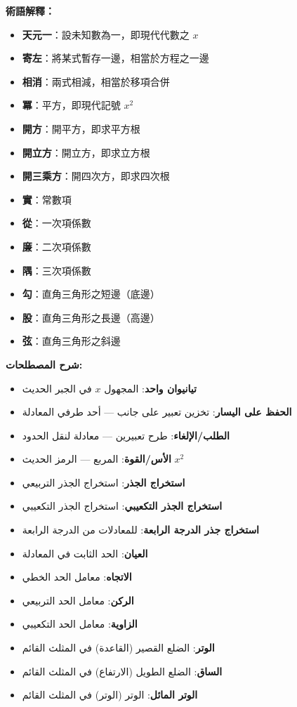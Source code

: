 \documentclass[11pt,a4paper]{article}
\begin{document}
\noindent
\begin{minipage}[t]{0.48\textwidth}
\textbf{術語解釋：}
\begin{itemize}[leftmargin=1.5em]
  \item \textbf{天元一}：設未知數為一，即現代代數之 $x$
  \item \textbf{寄左}：將某式暫存一邊，相當於方程之一邊
  \item \textbf{相消}：兩式相減，相當於移項合併
  \item \textbf{冪}：平方，即現代記號 $x^2$
  \item \textbf{開方}：開平方，即求平方根
  \item \textbf{開立方}：開立方，即求立方根
  \item \textbf{開三乘方}：開四次方，即求四次根
  \item \textbf{實}：常數項
  \item \textbf{從}：一次項係數
  \item \textbf{廉}：二次項係數
  \item \textbf{隅}：三次項係數
  \item \textbf{勾}：直角三角形之短邊（底邊）
  \item \textbf{股}：直角三角形之長邊（高邊）
  \item \textbf{弦}：直角三角形之斜邊
\end{itemize}
\end{minipage}
\hfill
\begin{minipage}[t]{0.48\textwidth}
\arabicfont\beginR
\textbf{شرح المصطلحات:}
\begin{itemize}[leftmargin=1.5em]
  \item \textbf{تيانيوان واحد}: المجهول $x$ في الجبر الحديث
  \item \textbf{الحفظ على اليسار}: تخزين تعبير على جانب — أحد طرفي المعادلة
  \item \textbf{الطلب/الإلغاء}: طرح تعبيرين — معادلة لنقل الحدود
  \item \textbf{الأس/القوة}: المربع — الرمز الحديث $x^2$
  \item \textbf{استخراج الجذر}: استخراج الجذر التربيعي
  \item \textbf{استخراج الجذر التكعيبي}: استخراج الجذر التكعيبي
  \item \textbf{استخراج جذر الدرجة الرابعة}: للمعادلات من الدرجة الرابعة
  \item \textbf{العيان}: الحد الثابت في المعادلة
  \item \textbf{الاتجاه}: معامل الحد الخطي
  \item \textbf{الركن}: معامل الحد التربيعي
  \item \textbf{الزاوية}: معامل الحد التكعيبي
  \item \textbf{الوتر}: الضلع القصير (القاعدة) في المثلث القائم
  \item \textbf{الساق}: الضلع الطويل (الارتفاع) في المثلث القائم
  \item \textbf{الوتر المائل}: الوتر (الوتر) في المثلث القائم
\end{itemize}
\endR
\end{minipage}
\end{document}
